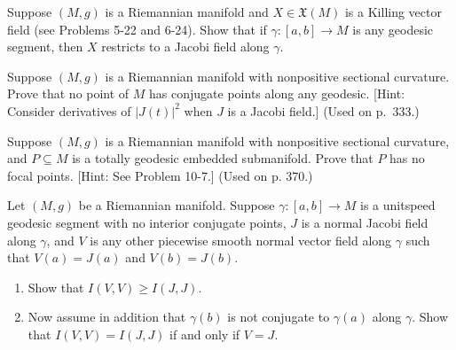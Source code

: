 \begin{exercise}\label{prob:killing-vector-jacobi-field}
Suppose $(M, g)$ is a Riemannian manifold and $X \in \mathfrak{X}(M)$ is a Killing vector field (see Problems 5-22 and 6-24). Show that if $\gamma: [a, b] \to M$ is any geodesic segment, then $X$ restricts to a Jacobi field along $\gamma$.
\end{exercise}

\begin{exercise}
\label{prob:nonpositive-curvature-conjugate-points}

Suppose $(M,g)$ is a Riemannian manifold with nonpositive sectional curvature. Prove that no point of $M$ has conjugate points along any geodesic. [Hint: Consider derivatives of $|J(t)|^2$ when $J$ is a Jacobi field.] (Used on p.~333.)
\end{exercise}

\begin{exercise}\label{prob:nonpositive-curvature-focal-points}
Suppose $(M,g)$ is a Riemannian manifold with nonpositive sectional curvature, and $P \subseteq M$ is a totally geodesic embedded submanifold. Prove that $P$ has no focal points. [Hint: See Problem 10-7.] (Used on p. 370.)
\end{exercise}

\begin{exercise}\label{prob:normal-jacobi-minimizes-index}
Let $(M, g)$ be a Riemannian manifold. Suppose $\gamma: [a, b] \to M$ is a unitspeed geodesic segment with no interior conjugate points, $J$ is a normal Jacobi field along $\gamma$, and $V$ is any other piecewise smooth normal vector field along $\gamma$ such that $V(a) = J(a)$ and $V(b) = J(b)$.
\begin{enumerate}
\item[(a)] Show that $I(V, V) \geq I(J, J)$.
\item[(b)] Now assume in addition that $\gamma(b)$ is not conjugate to $\gamma(a)$ along $\gamma$. Show that $I(V, V) = I(J, J)$ if and only if $V = J$.
\end{enumerate}
\end{exercise}

